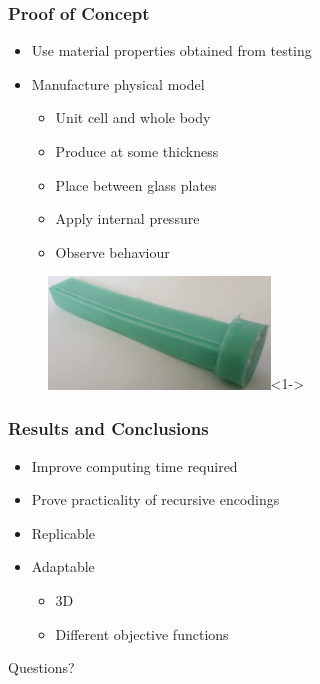 \documentclass[serif, pdf]{beamer}
\begin{document}

\begin{frame}
    \frametitle{Proof of Concept}
    \begin{itemize}
        \item<1-> Use material properties obtained from testing
        \item<2-> Manufacture physical model
        \changefontsizes{11pt}
        \begin{itemize}
            \item<3-> Unit cell and whole body
            \item<4-> Produce at some thickness
            \item<5-> Place between glass plates
            \item<6-> Apply internal pressure
            \item<7-> Observe behaviour
        \end{itemize}
    \end{itemize}
    \begin{figure}
        \centering
        \includegraphics[height = 3cm]{Mold_Star_15.jpg}<1->
    \end{figure}
\end{frame}


\begin{frame}
    \frametitle{Results and Conclusions}
    \begin{itemize}
        \item<1-> Improve computing time required
        \item<2-> Prove practicality of recursive encodings
        \item<3-> Replicable
        \item<4-> Adaptable
        \begin{itemize}
            \item<5-> 3D
            \item<6-> Different objective functions
        \end{itemize}
    \end{itemize}
\end{frame}


\begin{frame}
    \begin{center}
        \huge Questions?
    \end{center}
\end{frame}
\end{document}
